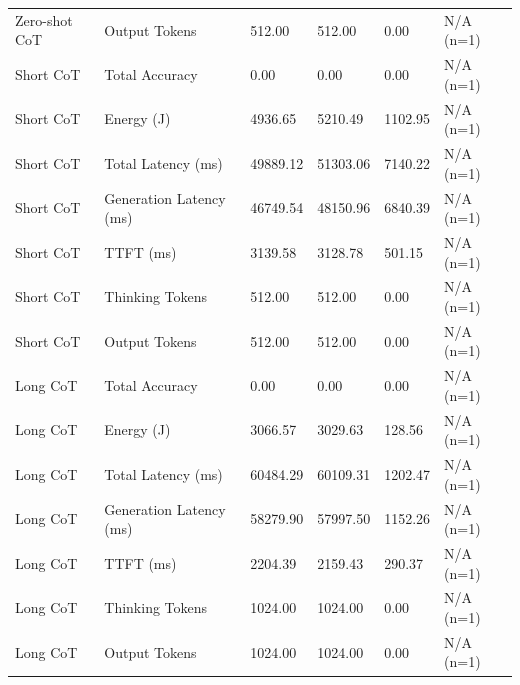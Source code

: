 \begin{table}
\begin{tabular}{llllll}
Zero-shot CoT & Output Tokens & 512.00 & 512.00 & 0.00 & N/A (n=1) \\
Short CoT & Total Accuracy & 0.00 & 0.00 & 0.00 & N/A (n=1) \\
Short CoT & Energy (J) & 4936.65 & 5210.49 & 1102.95 & N/A (n=1) \\
Short CoT & Total Latency (ms) & 49889.12 & 51303.06 & 7140.22 & N/A (n=1) \\
Short CoT & Generation Latency (ms) & 46749.54 & 48150.96 & 6840.39 & N/A (n=1) \\
Short CoT & TTFT (ms) & 3139.58 & 3128.78 & 501.15 & N/A (n=1) \\
Short CoT & Thinking Tokens & 512.00 & 512.00 & 0.00 & N/A (n=1) \\
Short CoT & Output Tokens & 512.00 & 512.00 & 0.00 & N/A (n=1) \\
Long CoT & Total Accuracy & 0.00 & 0.00 & 0.00 & N/A (n=1) \\
Long CoT & Energy (J) & 3066.57 & 3029.63 & 128.56 & N/A (n=1) \\
Long CoT & Total Latency (ms) & 60484.29 & 60109.31 & 1202.47 & N/A (n=1) \\
Long CoT & Generation Latency (ms) & 58279.90 & 57997.50 & 1152.26 & N/A (n=1) \\
Long CoT & TTFT (ms) & 2204.39 & 2159.43 & 290.37 & N/A (n=1) \\
Long CoT & Thinking Tokens & 1024.00 & 1024.00 & 0.00 & N/A (n=1) \\
Long CoT & Output Tokens & 1024.00 & 1024.00 & 0.00 & N/A (n=1) \\
\bottomrule
\end{tabular}
\end{table}
